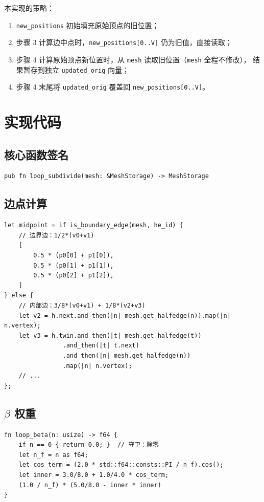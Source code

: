 \documentclass[11pt,a4paper]{article}
\begin{document}
本实现的策略：
\begin{enumerate}
  \item \texttt{new\_positions} 初始填充原始顶点的旧位置；
  \item 步骤 3 计算边中点时，\texttt{new\_positions[0..V]} 仍为旧值，直接读取；
  \item 步骤 4 计算原始顶点新位置时，从 \texttt{mesh} 读取旧位置（\texttt{mesh} 全程不修改），
        结果暂存到独立 \texttt{updated\_orig} 向量；
  \item 步骤 4 末尾将 \texttt{updated\_orig} 覆盖回 \texttt{new\_positions[0..V]}。
\end{enumerate}

\section{实现代码}

\subsection{核心函数签名}

\begin{lstlisting}
pub fn loop_subdivide(mesh: &MeshStorage) -> MeshStorage
\end{lstlisting}

\subsection{边点计算}

\begin{lstlisting}
let midpoint = if is_boundary_edge(mesh, he_id) {
    // 边界边：1/2*(v0+v1)
    [
        0.5 * (p0[0] + p1[0]),
        0.5 * (p0[1] + p1[1]),
        0.5 * (p0[2] + p1[2]),
    ]
} else {
    // 内部边：3/8*(v0+v1) + 1/8*(v2+v3)
    let v2 = h.next.and_then(|n| mesh.get_halfedge(n)).map(|n| n.vertex);
    let v3 = h.twin.and_then(|t| mesh.get_halfedge(t))
                .and_then(|t| t.next)
                .and_then(|n| mesh.get_halfedge(n))
                .map(|n| n.vertex);
    // ...
};
\end{lstlisting}

\subsection{$\beta$ 权重}

\begin{lstlisting}
fn loop_beta(n: usize) -> f64 {
    if n == 0 { return 0.0; }  // 守卫：除零
    let n_f = n as f64;
    let cos_term = (2.0 * std::f64::consts::PI / n_f).cos();
    let inner = 3.0/8.0 + 1.0/4.0 * cos_term;
    (1.0 / n_f) * (5.0/8.0 - inner * inner)
}
\end{lstlisting}
\end{document}
